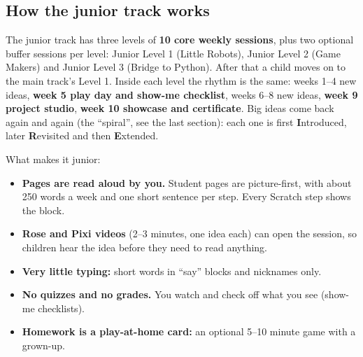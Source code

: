 \documentclass[track=junior,level=1,teacher]{kidscode}
\begin{document}
\subsection{How the junior track works}
The junior track has three levels of \textbf{10 core weekly sessions}, plus two optional buffer
sessions per level: Junior Level 1 (Little Robots), Junior Level 2 (Game Makers) and Junior Level 3
(Bridge to Python). After that a child moves on to the main track's Level 1. Inside each level the
rhythm is the same: weeks 1--4 new ideas, \textbf{week 5 play day and show-me checklist}, weeks 6--8
new ideas, \textbf{week 9 project studio}, \textbf{week 10 showcase and certificate}. Big ideas come
back again and again (the \enquote{spiral}, see the last section): each one is first
\textbf{I}ntroduced, later \textbf{R}evisited and then \textbf{E}xtended.

What makes it junior:
\begin{itemize}[itemsep=2pt]
  \item \textbf{Pages are read aloud by you.} Student pages are picture-first, with about 250 words
        a week and one short sentence per step. Every Scratch step shows the block.
  \item \textbf{Rose and Pixi videos} (2--3 minutes, one idea each) can open the session, so children
        hear the idea before they need to read anything.
  \item \textbf{Very little typing:} short words in \enquote{say} blocks and nicknames only.
  \item \textbf{No quizzes and no grades.} You watch and check off what you see (show-me checklists).
  \item \textbf{Homework is a play-at-home card:} an optional 5--10 minute game with a grown-up.
\end{itemize}
\end{document}
